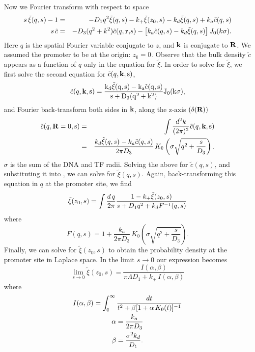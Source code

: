 Now we Fourier transform with respect to space
\begin{eqnarray}
 s \, \tilde{\xi}(q, s) - 1 & = & - D_1 q^2 \tilde{\xi}(q,s) - k_+ \tilde{\xi}(z_0,s) - k_d \tilde{\xi}(q,s) + k_a \tilde{c}(q, s) \elabel{FDE_dna} \\
 s \, \tilde{c} & = & - D_3 (q^2 + k^2) \tilde{c}(q, \mathbf r \mathrm, s) - \left[ k_a \tilde{c}(q, s) - k_d \tilde{\xi}(q,s) \right] J_{0}(k \sigma). 
 \elabel{FDE_bulk}
\end{eqnarray}
Here $q$ is the spatial Fourier variable conjugate to $z$, and $\bf k \rm$ is conjugate to $\bf R \bf$. We assumed the promoter to be at the origin: $z_0 = 0$. Observe that the bulk density $\tilde{c}$ appears as a function of $q$ only in the equation for $\tilde{\xi}$. In order to solve for $\tilde{\xi}$, we first solve the second equation for $\tilde{c}(q,\bf k \rm, s)$, 
\begin{equation}
 \tilde{c}(q,\bf k \rm, s) = \frac{k_d \tilde{\xi}(q,s) - k_a\tilde{c}(q,s)}{s + D_3(q^2 + k^2)} J_{0}(k \sigma ),
\end{equation}
and Fourier back-transform both sides in $\bf k \rm$, along the z-axis $(\delta(\bf R \rm))$
\begin{eqnarray}
 \tilde{c}(q,\bf R\rm=0, s) & = & \int \frac{d^2 k}{(2 \pi)^2} \tilde{c}(q,\bf k \rm, s) \\
				 & = & \frac{k_d \tilde{\xi}(q,s) - k_a\tilde{c}(q,s)}{2 \pi D_3} \, K_{0}\left( \sigma \sqrt{q^2 + \frac{s}{D_3}} \right).
\end{eqnarray}
$\sigma$ is the sum of the DNA and TF radii. Solving the above for $\tilde{c}(q,s)$, and substituting it into , we can solve for $\tilde{\xi}(q,s)$. Again, back-transforming this equation in $q$ at the promoter site, we find
\begin{equation}
 \tilde{\xi}(z_0, s) = \int \frac{d\,q}{2 \pi} \frac{1-k_+ \tilde{\xi}(z_0, s)}{s + D_1 q^2+k_d F^{-1}(q,s)}
 \elabel{FDE_dna2}
\end{equation}
where
\begin{equation}
F(q,s) = 1 + \frac{k_a}{2 \pi D_3} \, K_{0}\left( \sigma \sqrt{q^2 + \frac{s}{D_3}} \right).
\end{equation}
Finally, we can solve  for $\tilde{\xi}(z_0, s)$ to obtain the probability density at the promoter site in Laplace space. In the limit $s \rightarrow 0$ our expression becomes
\begin{equation}
 \lim_{s \rightarrow 0} \tilde{\xi}(z_0, s) = \frac{I(\alpha,\beta)}{\pi \Lambda D_1 + k_+ \, I(\alpha,\beta)}
\end{equation}
where
\begin{gather}
 I(\alpha,\beta) = \int_0^{\infty} \frac{dt}{t^2 + \beta[1 + \alpha \, K_0(t)]^{-1}} \\
 \alpha = \frac{k_a}{2 \pi D_3} \elabel{EqAlpha} \\
 \beta = \frac{\sigma^2 k_d}{D_1} \elabel{EqBeta}.
\end{gather}

